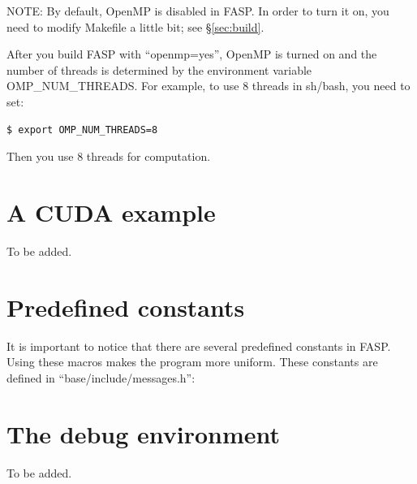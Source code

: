 \documentclass[11pt]{memoir}
\begin{document}
\begin{snugshade}\noindent
NOTE: By default, OpenMP is disabled in FASP. In order to turn it on, you need to modify Makefile a little bit; see \S\ref{sec:build}.
\end{snugshade}

After you build FASP with ``openmp=yes'', OpenMP is turned on and the number of threads is determined by the environment variable OMP\_NUM\_THREADS. For example, to use 8 threads in {\color{red} sh/bash}, you need to set:
\begin{lstlisting}[numbers=none]
$ export OMP_NUM_THREADS=8
\end{lstlisting}
Then you use 8 threads for computation.

\section{A CUDA example}\label{sec:cuda}

To be added.

\section{Predefined constants}\label{sec:const}

It is important to notice that there are several predefined constants in FASP. Using these macros makes the program more uniform. These constants are defined in ``base/include/messages.h'':
%


\section{The debug environment}\label{sec:debug}

To be added.


\end{document}
